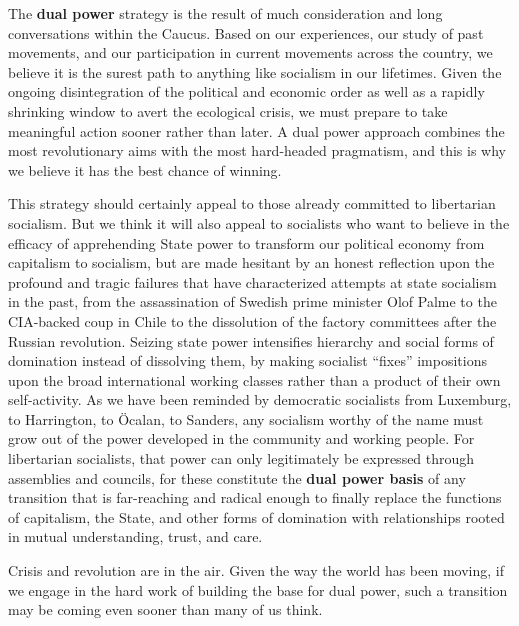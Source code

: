\documentclass[10pt]{memoir}
\def \href #1#2{#2} %
\begin{document}
The \textbf{dual power} strategy is the result of much consideration and
long conversations within the Caucus. Based on our experiences, our
study of past movements, and our participation in current movements
across the country, we believe it is the surest path to anything like
socialism in our lifetimes. Given the ongoing disintegration of the
political and economic order as well as a rapidly shrinking window to
avert the ecological crisis, we must prepare to take meaningful action
sooner rather than later. A dual power approach combines the most
revolutionary aims with the most hard-headed pragmatism, and this is why
we believe it has the best chance of winning.

This strategy should certainly appeal to those already committed to
libertarian socialism. But we think it will also appeal to socialists
who want to believe in the efficacy of apprehending State power to
transform our political economy from capitalism to socialism, but are
made hesitant by an honest reflection upon the profound and tragic
failures that have characterized attempts at state socialism in the
past, from
\href{https://www.theguardian.com/world/2016/nov/15/sweden-relaunches-olof-palme-investigation}{the
assassination of Swedish prime minister Olof Palme} to the
\href{https://www.versobooks.com/blogs/4016-the-coup-in-chile}{CIA-backed
coup in Chile} to the
\href{https://libcom.org/library/soviets-factory-committees-russian-revolution-peter-rachleff}{dissolution
of the factory committees after the Russian revolution}. Seizing state
power intensifies hierarchy and social forms of domination instead of
dissolving them, by making socialist ``fixes'' impositions upon the
broad international working classes rather than a product of their own
self-activity. As we have been reminded by democratic socialists from
Luxemburg, to Harrington, to Öcalan, to Sanders, any socialism worthy of
the name must grow out of the power developed in the community and
working people. For libertarian socialists, that power can only
legitimately be expressed through assemblies and councils, for these
constitute the \textbf{dual power basis} of any transition that is
far-reaching and radical enough to finally replace the functions of
capitalism, the State, and other forms of domination with relationships
rooted in mutual understanding, trust, and care.

Crisis and revolution are in the air. Given the way the world has been
moving, if we engage in the hard work of building the base for dual
power, such a transition may be coming even sooner than many of us
think.
\end{document}
